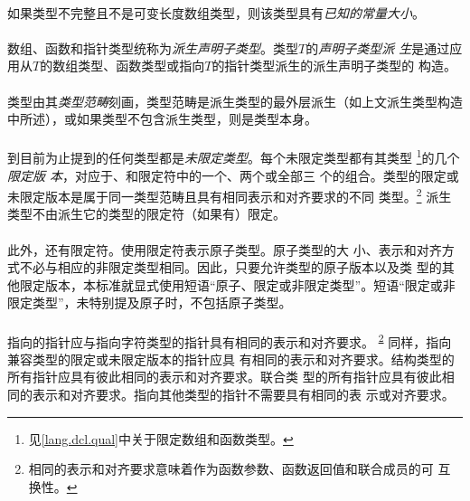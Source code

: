 {\paragraph{}
如果类型不完整且不是可变长度数组类型，则该类型具有\textit{已知的常量大小}。

\paragraph{}
数组、函数和指针类型统称为\textit{派生声明子类型}。类型$T$的\textit{声明子类型派
生}是通过应用从$T$的数组类型、函数类型或指向$T$的指针类型派生的派生声明子类型的
构造。

\paragraph{}
类型由其\textit{类型范畴}刻画，类型范畴是派生类型的最外层派生（如上文派生类型构造
中所述），或如果类型不包含派生类型，则是类型本身。

\paragraph{}
到目前为止提到的任何类型都是\textit{未限定类型}。每个未限定类型都有其类型
\footnote{见\ref{lang.dcl.qual}中关于限定数组和函数类型。}的几个\textit{限定版
本}，对应于、和限定符中的一个、两个或全部三
个的组合。类型的限定或未限定版本是属于同一类型范畴且具有相同表示和对齐要求的不同
类型。\footnote{相同的表示和对齐要求意味着作为函数参数、函数返回值和联合成员的可
互换性。\label{interchg}} 派生类型不由派生它的类型的限定符（如果有）限定。

\paragraph{}
此外，还有限定符。使用限定符表示原子类型。原子类型的大
小、表示和对齐方式不必与相应的非限定类型相同。因此，只要允许类型的原子版本以及类
型的其他限定版本，本标准就显式使用短语``原子、限定或非限定类型''。短语``限定或非
限定类型''，未特别提及原子时，不包括原子类型。

\paragraph{}
指向的指针应与指向字符类型的指针具有相同的表示和对齐要求。
\textsuperscript{\ref{interchg}} 同样，指向兼容类型的限定或未限定版本的指针应具
有相同的表示和对齐要求。结构类型的所有指针应具有彼此相同的表示和对齐要求。联合类
型的所有指针应具有彼此相同的表示和对齐要求。指向其他类型的指针不需要具有相同的表
示或对齐要求。

}
